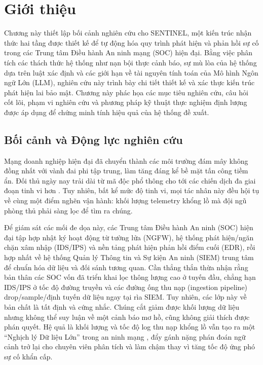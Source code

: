 \chapter{Giới thiệu}
\label{ch:introduction}

Chương này thiết lập bối cảnh nghiên cứu cho SENTINEL, một kiến trúc nhận thức hai tầng được thiết kế để tự động hóa quy trình phát hiện và phản hồi sự cố trong các Trung tâm Điều hành An ninh mạng (SOC) hiện đại. Bằng việc phân tích các thách thức hệ thống như nạn bội thực cảnh báo, sự mù lòa của hệ thống dựa trên luật xác định và các giới hạn về tài nguyên tính toán của Mô hình Ngôn ngữ Lớn (LLM), nghiên cứu này trình bày chi tiết thiết kế và xác thực kiến trúc phát hiện lai bảo mật. Chương này phác họa các mục tiêu nghiên cứu, câu hỏi cốt lõi, phạm vi nghiên cứu và phương pháp kỹ thuật thực nghiệm định lượng được áp dụng để chứng minh tính hiệu quả của hệ thống đề xuất.

\section{Bối cảnh và Động lực nghiên cứu}

Mạng doanh nghiệp hiện đại đã chuyển thành các môi trường đám mây không đồng nhất với vành đai phi tập trung, làm tăng đáng kể bề mặt tấn công tiềm ẩn. Đối thủ ngày nay trải dài từ mã độc phổ thông cho tới các chiến dịch đa giai đoạn tinh vi hơn \cite{mlids2016}. Tuy nhiên, bất kể mức độ tinh vi, mọi tác nhân này đều hội tụ về cùng một điểm nghẽn vận hành: khối lượng telemetry khổng lồ mà đội ngũ phòng thủ phải sàng lọc để tìm ra chúng.

Để giám sát các mối đe dọa này, các Trung tâm Điều hành An ninh (SOC) hiện đại tập hợp nhật ký hoạt động từ tường lửa (NGFW), hệ thống phát hiện/ngăn chặn xâm nhập (IDS/IPS) và nền tảng phát hiện phản hồi điểm cuối (EDR), rồi hợp nhất về hệ thống Quản lý Thông tin và Sự kiện An ninh (SIEM) trung tâm \cite{siem2021} để chuẩn hóa dữ liệu và đối sánh tương quan. Cần thẳng thắn thừa nhận rằng bản thân các SOC vốn đã triển khai lọc thông lượng cao ở tuyến đầu, chẳng hạn IDS/IPS ở tốc độ đường truyền và các đường ống thu nạp (ingestion pipeline) drop/sample/định tuyến dữ liệu ngay tại rìa SIEM. Tuy nhiên, các lớp này về bản chất là tất định và cứng nhắc. Chúng cắt giảm được khối lượng dữ liệu nhưng không thể suy luận về một cảnh báo mơ hồ, cũng không giải thích được phán quyết. Hệ quả là khối lượng và tốc độ log thu nạp khổng lồ vẫn tạo ra một ``Nghịch lý Dữ liệu Lớn'' trong an ninh mạng \cite{bigdata2019}, đẩy gánh nặng phán đoán ngữ cảnh trở lại cho chuyên viên phân tích và làm chậm thay vì tăng tốc độ ứng phó sự cố khẩn cấp.

